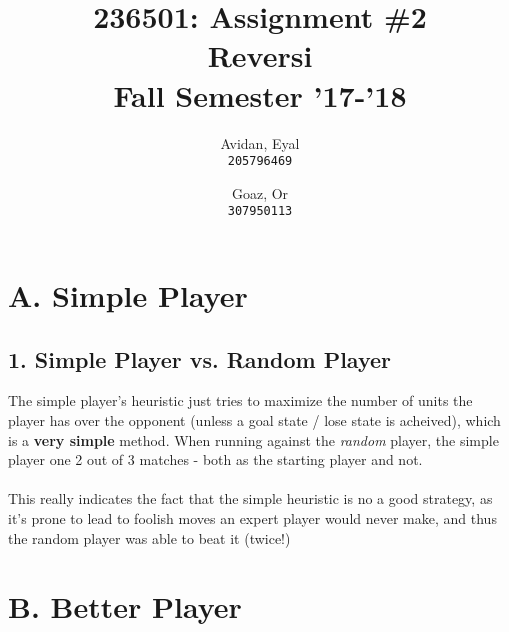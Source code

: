 \documentclass{article}
\begin{document}
\title{%
  236501: Assignment \#2 \\
  \large Reversi \\
    Fall Semester '17-'18}

\author{
  Avidan, Eyal \\
  \texttt{205796469}
  \and
  Goaz, Or \\
  \texttt{307950113}
}

\maketitle

\section*{A. Simple Player}
\subsection*{1. Simple Player vs. Random Player}
The simple player's heuristic just tries to maximize the number of units the player has over the opponent (unless a goal state / lose state is acheived), which is a \textbf{very simple} method. When running against the \emph{random} player, the simple player one 2 out of 3 matches - both as the starting player and not. \\~\\
This really indicates the fact that the simple heuristic is no a good strategy, as it's prone to lead to foolish moves an expert player would never make, and thus the random player was able to beat it (twice!)

\section*{B. Better Player}
\end{document}
